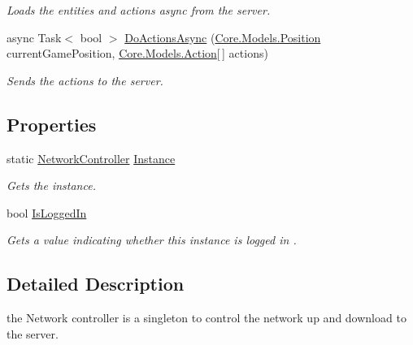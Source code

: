 \begin{DoxyCompactItemize}
\begin{DoxyCompactList}\small\item\em Loads the entities and actions async from the server. \end{DoxyCompactList}\item 
async Task$<$ bool $>$ \hyperlink{classClient_1_1Common_1_1Controllers_1_1NetworkController_a475c46ddb8c5dc4db7dea1530af9bf4b}{Do\+Actions\+Async} (\hyperlink{classCore_1_1Models_1_1Position}{Core.\+Models.\+Position} current\+Game\+Position, \hyperlink{classCore_1_1Models_1_1Action}{Core.\+Models.\+Action}\mbox{[}$\,$\mbox{]} actions)
\begin{DoxyCompactList}\small\item\em Sends the actions to the server. \end{DoxyCompactList}\end{DoxyCompactItemize}
\subsection*{Properties}
\begin{DoxyCompactItemize}
\item 
static \hyperlink{classClient_1_1Common_1_1Controllers_1_1NetworkController}{Network\+Controller} \hyperlink{classClient_1_1Common_1_1Controllers_1_1NetworkController_a24ad367082839e77f347f4a532d023ff}{Instance}
\begin{DoxyCompactList}\small\item\em Gets the instance. \end{DoxyCompactList}\item 
bool \hyperlink{classClient_1_1Common_1_1Controllers_1_1NetworkController_afd2b5bdfc0da3720c3bbb257c0f73d94}{Is\+Logged\+In}
\begin{DoxyCompactList}\small\item\em Gets a value indicating whether this instance is logged in . \end{DoxyCompactList}\end{DoxyCompactItemize}


\subsection{Detailed Description}
the Network controller is a singleton to control the network up and download to the server. 



